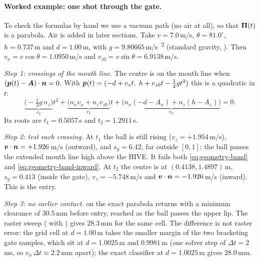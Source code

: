 
\paragraph{Worked example: one shot through the gate.} To check the formulas by hand we use a
vacuum path (no air at all), so that $\bm{\Pi}(t)$ is a parabola. Air is added in later
sections. Take $v = 7.0$\,\unit{m/s}\assumed, $\theta = 81.0^\circ$\assumed, $h = 0.737$\,\unit{m}\assumed{}
and $d = 1.00$\,\unit{m}\assumed, with $g = 9.80665$\,\unit{m/s\textsuperscript{2}}\confirmed{}
(standard gravity, ). Then
$v_x = v\cos\theta = 1.0950$\,\unit{m/s}\derived{} and $v_{z0} = v\sin\theta = 6.9138$\,\unit{m/s}\derived.

\emph{Step 1: crossings of the mouth line.} The centre is on the mouth line when
$(\bm{p}(t) - \bm{A})\cdot\bm{n} = 0$. With $\bm{p}(t) = (-d + v_x t,\; h + v_{z0}t - \tfrac12 g t^2)$
this is a quadratic in $t$:
\begin{equation}
  \underbrace{\bigl(-\tfrac12 g\,n_z\bigr)}_{c_2} t^2
  + \underbrace{\bigl(n_x v_x + n_z v_{z0}\bigr)}_{c_1} t
  + \underbrace{\bigl(n_x(-d - A_x) + n_z(h - A_z)\bigr)}_{c_0} = 0 .
  \label{eq:geometry-quadratic}
\end{equation}
Its roots are $t_1 = 0.5057$\,\unit{s}\predicted{} and $t_2 = 1.2911$\,\unit{s}\predicted.

\emph{Step 2: test each crossing.} At $t_1$ the ball is still rising
($v_z = +1.954$\,\unit{m/s}\predicted), $\bm{v}\cdot\bm{n} = +1.926$\,\unit{m/s}\predicted{} (outward),
and $s_g = 6.42$\predicted{}, far outside $[0, 1]$: the ball passes the extended mouth line high above
the HIVE. It fails both \eqref{eq:geometry-band} and \eqref{eq:geometry-band-inward}. At $t_2$ the centre is at
$(0.4138, 1.4897)$\,\unit{m}\predicted, $s_g = 0.413$\predicted{} (inside the gate),
$v_z = -5.748$\,\unit{m/s}\predicted{} and $\bm{v}\cdot\bm{n} = -1.926$\,\unit{m/s}\predicted{}
(inward). This is the entry.

\emph{Step 3: no earlier contact.}  on the exact parabola returns
 with a minimum clearance of $30.5$\,\unit{mm}\predicted{} before entry, reached as the
ball passes the upper lip. The raster sweep ( with ) gives
$28.3$\,\unit{mm}\predicted{} for the same cell. The difference is not raster error: the grid
cell at $d = 1.00$\,\unit{m}\assumed{} takes the smaller margin of the two bracketing gate samples, which
sit at $d = 1.0025$\,\unit{m}\predicted{} and $0.9981$\,\unit{m}\predicted{} (one solver step of $\Delta t = 2$\,\unit{ms}\assumed{}, so
$v_x\,\Delta t \approx 2.2$\,\unit{mm}\derived{} apart); the exact classifier at
$d = 1.0025$\,\unit{m}\predicted{} gives $28.0$\,\unit{mm}\predicted.

